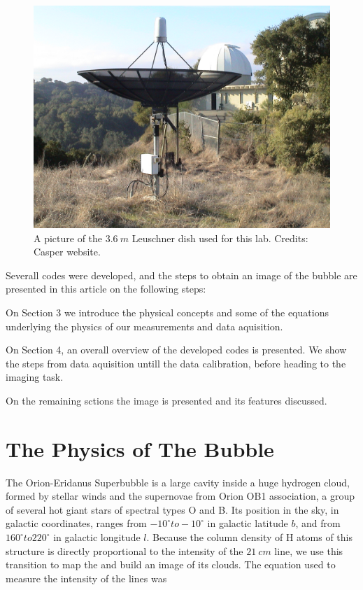 \documentclass{article}
\begin{document}
\begin{figure}[H]
\center
\includegraphics[scale=0.15]{dish.jpg}
\caption {A picture of the $3.6 \ m$ Leuschner dish used for this lab. Credits: Casper website.} 
\label{antenna}
\end{figure}

Severall codes were developed, and the steps to
obtain an image of the bubble are presented in this article on the
following steps:

On Section 3 we introduce the physical concepts and some of the
equations underlying the physics of our measurements and data
aquisition.

On Section 4, an overall overview of the developed codes is presented. 
We show the steps from data aquisition untill the data
calibration, before heading to the imaging task.

On the remaining sctions the image is presented and its features
discussed.

\section{The Physics of The Bubble}

The Orion-Eridanus Superbubble is a large cavity inside a huge hydrogen
cloud, formed by stellar winds and the supernovae from Orion OB1
association, a group of several hot giant stars of spectral types O and
B. Its position in the sky, in galactic coordinates, ranges from $-10
^{\circ} to -10^{\circ}$ in galactic latitude $b$, and from $160^{\circ}
to 220^{\circ}$ in galactic longitude $l$. Because the column density of
H atoms of this structure is directly proportional to the intensity of
the $21 \ cm$ line, we use this transition to map the and build an image
of its clouds. The equation used to measure the intensity of the lines
was 
\end{document}
